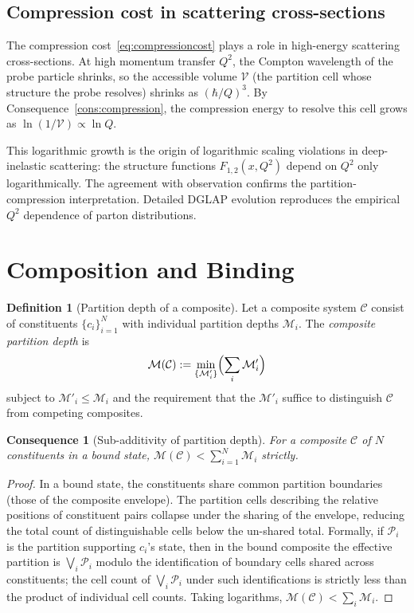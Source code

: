 \documentclass[11pt,twocolumn,a4paper]{article}
\theoremstyle{axiomstyle}
\theoremstyle{conseqstyle}
\newtheorem{consequence}{Consequence}
\theoremstyle{definition}
\newtheorem{definition}{Definition}
\theoremstyle{remark}
\newcommand{\Depth}{\mathcal{M}}
\newcommand{\Partition}{\mathcal{P}}
\begin{document}
\subsection{Compression cost in scattering cross-sections}

The compression cost~\eqref{eq:compressioncost} plays a role in high-energy scattering cross-sections. At high momentum transfer $Q^{2}$, the Compton wavelength of the probe particle shrinks, so the accessible volume $\mathcal{V}$ (the partition cell whose structure the probe resolves) shrinks as $(\hbar/Q)^{3}$. By Consequence~\ref{cons:compression}, the compression energy to resolve this cell grows as $\ln(1/\mathcal{V})\propto \ln Q$.

This logarithmic growth is the origin of logarithmic scaling violations in deep-inelastic scattering: the structure functions $F_{1,2}(x,Q^{2})$ depend on $Q^{2}$ only logarithmically. The agreement with observation confirms the partition-compression interpretation. Detailed DGLAP evolution reproduces the empirical $Q^{2}$ dependence of parton distributions.

\section{Composition and Binding}
\label{sec:binding}

\begin{definition}[Partition depth of a composite]
\label{def:depthcomposite}
Let a composite system $\mathcal{C}$ consist of constituents $\{c_{i}\}_{i=1}^{N}$ with individual partition depths $\Depth_{i}$. The \emph{composite partition depth} is
\begin{equation*}
\Depth(\mathcal{C}):=\min_{\{\Depth'_{i}\}}\Bigl(\sum_{i}\Depth'_{i}\Bigr)
\end{equation*}
subject to $\Depth'_{i}\le\Depth_{i}$ and the requirement that the $\Depth'_{i}$ suffice to distinguish $\mathcal{C}$ from competing composites.
\end{definition}

\begin{consequence}[Sub-additivity of partition depth]
\label{cons:subadditivity}
For a composite $\mathcal{C}$ of $N$ constituents in a bound state, $\Depth(\mathcal{C})<\sum_{i=1}^{N}\Depth_{i}$ strictly.
\end{consequence}

\begin{proof}
In a bound state, the constituents share common partition boundaries (those of the composite envelope). The partition cells describing the relative positions of constituent pairs collapse under the sharing of the envelope, reducing the total count of distinguishable cells below the un-shared total. Formally, if $\Partition_{i}$ is the partition supporting $c_{i}$'s state, then in the bound composite the effective partition is $\bigvee_{i}\Partition_{i}$ modulo the identification of boundary cells shared across constituents; the cell count of $\bigvee_{i}\Partition_{i}$ under such identifications is strictly less than the product of individual cell counts. Taking logarithms, $\Depth(\mathcal{C})<\sum_{i}\Depth_{i}$.
\end{proof}
\end{document}
